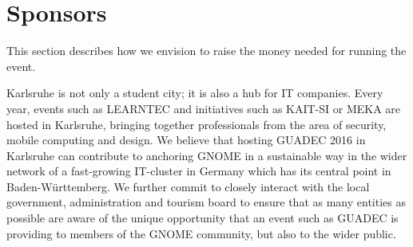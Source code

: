 \newpage


\vspace*{8.8cm}

\section{Sponsors}

This section describes how we envision to raise the money needed for running the event.

Karlsruhe is not only a student city; it is also a hub for IT companies. Every year, events such as LEARNTEC and initiatives such as KAIT-SI or MEKA are hosted in Karlsruhe, bringing together professionals from the area of security, mobile computing and design.
We believe that hosting GUADEC 2016 in Karlsruhe can contribute to anchoring GNOME in a sustainable way in the wider network of a fast-growing IT-cluster in Germany which has its central point in Baden-Württemberg.
We further commit to closely interact with the local government, administration and tourism board to ensure that as many entities as possible are aware of the unique opportunity that an event such as GUADEC is providing to members of the GNOME community, but also to the wider public.  


